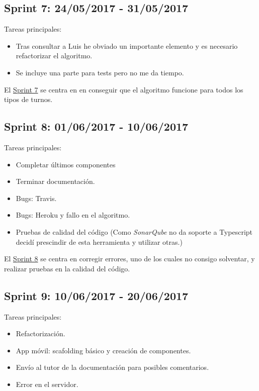 \subsection{Sprint 7: 24/05/2017 - 31/05/2017}\label{sprint7}

Tareas principales:

\begin{itemize}

		\item Tras consultar a Luis he obviado un importante elemento y es necesario refactorizar el algoritmo.
	\item Se incluye una parte para tests pero no me da tiempo.
\end{itemize}


El \underline{Sprint 7} se centra en en conseguir que el algoritmo funcione para todos los tipos de turnos.

\subsection{Sprint 8: 01/06/2017 - 10/06/2017}\label{sprint8}

Tareas principales:

\begin{itemize}
	\item Completar últimos componentes
	\item Terminar documentación.
	\item Bugs: Travis. 
	\item Bugs: Heroku y fallo en el algoritmo.
	\item Pruebas de calidad del código (Como \emph{SonarQube} no da soporte a Typescript decidí prescindir de esta herramienta y utilizar otras.)
\end{itemize}


El \underline{Sprint 8} se centra en corregir errores, uno de los cuales no consigo solventar, y realizar pruebas en la calidad del código. 

\subsection{Sprint 9: 10/06/2017 - 20/06/2017}\label{sprint9}

Tareas principales:

\begin{itemize}
	\item Refactorización.
	\item App móvil: scafolding básico y creación de componentes.
	\item Envío al tutor de la documentación para posibles comentarios.
	\item Error en el servidor.
	
\end{itemize}

